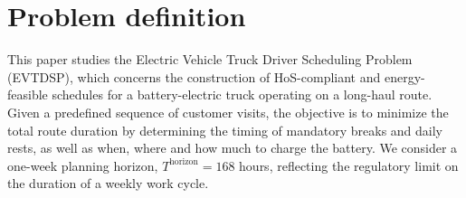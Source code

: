 \documentclass[3p,11pt,authoryear]{elsarticle}  %
\begin{document}

 \section{Problem definition}
    



This paper studies the Electric Vehicle Truck Driver Scheduling Problem (EVTDSP), which concerns the construction of HoS-compliant and energy-feasible schedules for a battery-electric truck operating on a long-haul route. Given a predefined sequence of customer visits, the objective is to minimize the total route duration by determining the timing of mandatory breaks and daily rests, as well as when, where and how much to  charge the battery. We consider a one-week planning horizon, \(T^{\text{horizon}}=168\) hours, reflecting the regulatory limit on the duration of a weekly work cycle.
\end{document}
